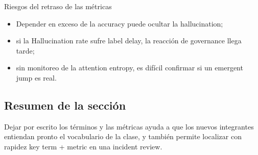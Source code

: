 \begin{warningbox}{Riesgos del retraso de las métricas}
\begin{itemize}
    \item Depender en exceso de la accuracy puede ocultar la hallucination;
    \item si la Hallucination rate sufre label delay, la reacción de governance llega tarde;
    \item sin monitoreo de la attention entropy, es difícil confirmar si un emergent jump es real.
\end{itemize}
\end{warningbox}

\subsection{Resumen de la sección}

Dejar por escrito los términos y las métricas ayuda a que los nuevos integrantes entiendan pronto el vocabulario de la clase, y también permite localizar con rapidez key term + metric en una incident review.
